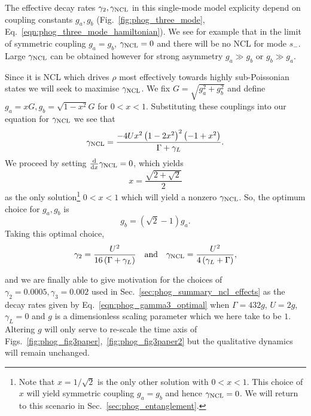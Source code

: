 The effective decay rates $\gamma_2, \gamma_{\text{NCL}}$ in this single-mode model explicity depend on coupling constants $g_a, g_b$ (Fig.~\ref{fig:phog_three_mode}, Eq.~\ref{eqn:phog_three_mode_hamiltonian}). We see for example that in the limit of symmetric coupling $g_a = g_b$, $\gamma_{\text{NCL}} = 0$ and there will be no NCL for mode $s_-$. Large $\gamma_{\text{NCL}}$ can be obtained however for strong asymmetry $g_a \gg g_b$ or $g_b \gg g_a$. 

Since it is NCL which drives $\rho$ most effectively towards highly sub-Poissonian states we will seek to maximise $\gamma_{\text{NCL}}$. We fix $G = \sqrt{g_a^2 + g_b^2}$ and define $g_a = x G, g_b = \sqrt{1-x^2}G$ for $0 < x < 1$. Substituting these couplings into our equation for $\gamma_{\text{NCL}}$ we see that
\begin{equation}
\gamma_{\text{NCL}} = \frac{- 4 U x^2 \left(1 - 2 x^2\right)^2 \left(-1 + x^2\right)}{\Gamma + \gamma_L}.
\end{equation}
We proceed by setting $\frac{\mathrm{d}}{\mathrm{d}x} \gamma_{\text{NCL}} = 0$, which yields
\begin{equation}
x = \frac{\sqrt{2 + \sqrt{2}}}{2}
\end{equation}
as the only solution\footnote{Note that $x = 1/\sqrt{2}$ is the only other solution with $0 < x < 1$. This choice of $x$ will yield symmetric coupling $g_a = g_b$ and hence $\gamma_{\text{NCL}}=0$. We will return to this scenario in Sec.~\ref{sec:phog_entanglement}.} $0 < x < 1$ which will yield a nonzero $\gamma_{\text{NCL}}$. So, the optimum choice for $g_a, g_b$ is
\begin{equation}\label{eqn:phog_gagb_optimal}
g_b = \left(\sqrt{2} - 1\right)g_a.
\end{equation}
Taking this optimal choice,
\begin{equation}\label{eqn:phog_gamma3_optimal}
\gamma_2 = \frac{U^2}{16\left(\Gamma + \gamma_L\right)} \qq{and} \gncl = \frac{U^2}{4 \left(\gamma_L + \Gamma\right)},
\end{equation}

\noindent and we are finally able to give motivation for the choices of $\gamma_2=0.0005, \gamma_3=0.002$ used in Sec.~\ref{sec:phog_summary_ncl_effects} as the decay rates given by Eq.~\ref{eqn:phog_gamma3_optimal} when $\Gamma = 432 g$, $U = 2 g$, $\gamma_L = 0$ and $g$ is a dimensionless scaling parameter which we here take to be $1$. Altering $g$ will only serve to re-scale the time axis of Figs.~\ref{fig:phog_fig3paper},~\ref{fig:phog_fig3paper2} but the qualitative dynamics will remain unchanged. 

